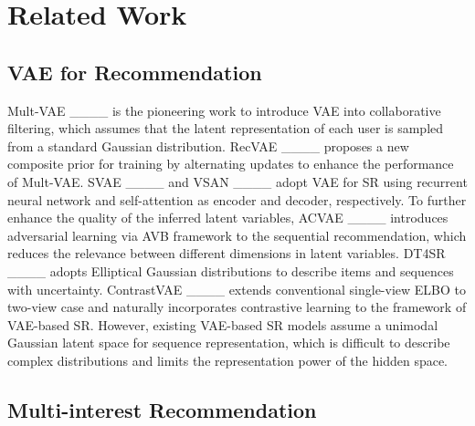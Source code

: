 \section{Related Work}
\vspace{-0.2cm} \subsection{VAE for Recommendation}

 Mult-VAE ____ is the pioneering work to introduce VAE into collaborative filtering, which assumes that the latent representation of each user is sampled from a standard Gaussian distribution. RecVAE ____ proposes a new composite prior for training by alternating updates to enhance the performance of Mult-VAE. SVAE ____ and VSAN ____ adopt VAE for SR using recurrent neural network and self-attention as encoder and decoder, respectively. To further enhance the quality of the inferred latent variables, ACVAE ____ introduces adversarial learning via AVB framework to the sequential recommendation, which reduces the relevance between different dimensions in latent variables. DT4SR ____ adopts Elliptical Gaussian distributions to describe items and sequences with uncertainty. ContrastVAE ____ extends conventional single-view ELBO to two-view case and naturally incorporates contrastive learning to the framework of VAE-based SR. However, existing VAE-based SR models assume a unimodal Gaussian latent space for sequence representation, which is difficult to describe complex distributions and limits the representation power of the hidden space. 

\vspace{-0.2cm} \subsection{Multi-interest Recommendation} 

